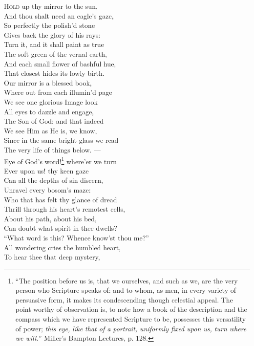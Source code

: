 \textsc{Hold} up thy mirror to the sun, \\
 And thou shalt need an eagle’s gaze, \\
 So perfectly the polish’d stone \\
 Gives back the glory of his rays: \\
  Turn it, and it shall paint as true \\
 The soft green of the vernal earth, \\
 And each small flower of bashful hue, \\
 That closest hides its lowly birth. \\
  Our mirror is a blessed book, \\
 Where out from each illumin’d page \\
 We see one glorious Image look \\
 All eyes to dazzle and engage, \\
  The Son of God: and that indeed \\
 We see Him as He is, we know, \\
 Since in the same bright glass we read \\
 The very life of things below. — \\
  Eye of God’s word!\footnote{“The position before us is, that we ourselves, and such as we, are the very person who Scripture speaks of: and to whom, as men, in every variety of persuasive form, it makes its condescending though celestial appeal. The point worthy of observation is, to note how a book of the description and the compass which we have represented Scripture to be, possesses this versatility of power; \emph{this eye, like that of a portrait, uniformly fixed upon us, turn where we will.}” Miller’s Bampton Lectures, p. 128.} where’er we turn \\
 Ever upon us! thy keen gaze \\
 Can all the depths of sin discern, \\
 Unravel every bosom’s maze: \\
  Who that has felt thy glance of dread \\
 Thrill through his heart’s remotest cells, \\
 About his path, about his bed, \\
 Can doubt what spirit in thee dwells? \\
  “What word is this? Whence know’st thou me?” \\
 All wondering cries the humbled heart, \\
 To hear thee that deep mystery, \\
